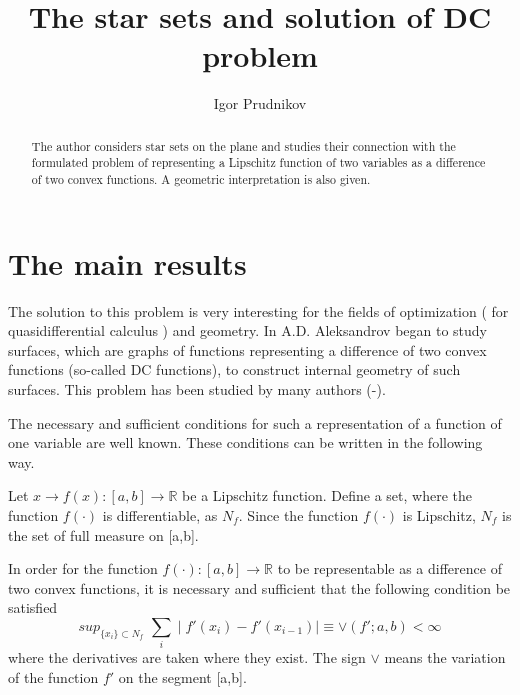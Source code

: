 \documentclass[12pt]{llncs}
\begin{document}
\fi

%
\title{The star sets and solution of DC problem}
\author{Igor Prudnikov 
}


\maketitle

\begin{abstract}

The author considers star sets on the plane and studies their
connection with the formulated problem of representing a Lipschitz
function of two variables as a difference of two convex functions.
A geometric interpretation is also given.

\end{abstract}

\section{The main results}

The solution to this problem is very interesting for the fields of
optimization ( for quasidifferential calculus ) and geometry. In
\cite{aleksandrov1} A.D. Aleksandrov began to study surfaces,
which are graphs of functions representing a difference of two
convex functions (so-called DC functions), to construct internal
geometry of such surfaces. This problem has been studied by many
authors (\cite{aleksandrov2}-\cite{zalgaller1}).

The necessary and sufficient conditions for such a representation
of a function of one variable are well known. These conditions can
be written in the following way.

Let $x \rightarrow f(x): [a,b] \rightarrow \mathbb{R}$ be a
Lipschitz function. Define a set, where the function $f(\cdot)$ is
differentiable, as $N_f$. Since the function $ f(\cdot)$  is
Lipschitz, $N_f$ is the set  of full measure on [a,b].


In order for the function $f(\cdot): [a,b] \rightarrow \mathbb{R}$
to be representable as a difference of two convex functions, it is
necessary and sufficient that the following condition be satisfied
$$
sup_{ \{x_i\} \subset N_f} \,\, \sum_i \mid f'(x_i) - f'(x_{i-1})
\mid \equiv  \vee (f'; a,b) < \infty
$$
where the derivatives are taken where they exist. The sign  $\vee$
means the variation of the function $ f'$ on the segment  [a,b].
\end{document}
